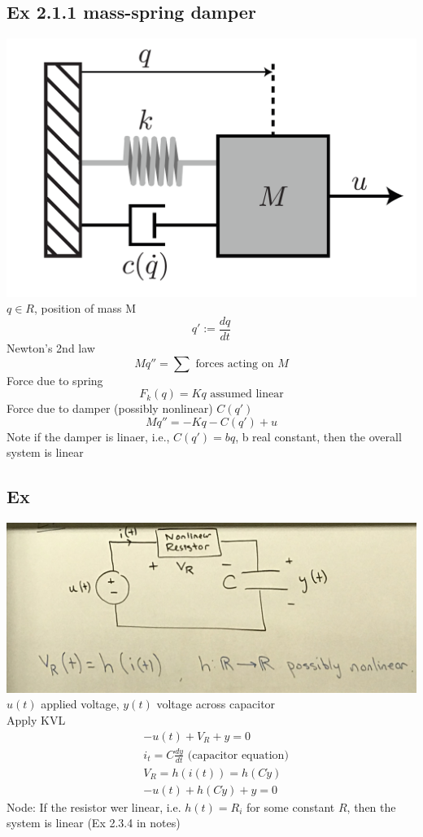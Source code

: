 \documentclass[letterpaper]{article}
\begin{document}
\subsection*{Ex 2.1.1 mass-spring damper}
\includegraphics[scale=0.5]{images/EX2_1_1.png}
$q\in R$, position of mass M
$$q':=\frac{dq}{dt}$$
Newton's 2nd law $$Mq''=\sum \text{ forces acting on } M$$
Force due to spring $$F_k(q)=Kq \text{ assumed linear}$$
Force due to damper (possibly nonlinear) $C(q')$
$$Mq''=-Kq-C(q')+u$$
Note if the damper is linaer, i.e., $C(q')=bq$, b real constant, then the overall system is linear
\subsection*{Ex}
\includegraphics[scale=0.1]{images/EX2_1_2.jpg}\\
$u(t)$ applied voltage, $y(t)$ voltage across capacitor\\
Apply KVL 
\begin{align*}
    & -u(t)+V_R+y=0                                   \\
    & i_t=C\frac{dy}{dt} \text{ (capacitor equation)} \\
    & V_R=h(i(t))=h(C\dot y)                          \\
    & -u(t)+h(C\dot y)+y=0                            
\end{align*}
Node: If the resistor wer linear, i.e. $h(t)=R_i$ for some constant $R$, then the system is linear (Ex 2.3.4 in notes)
\end{document}

